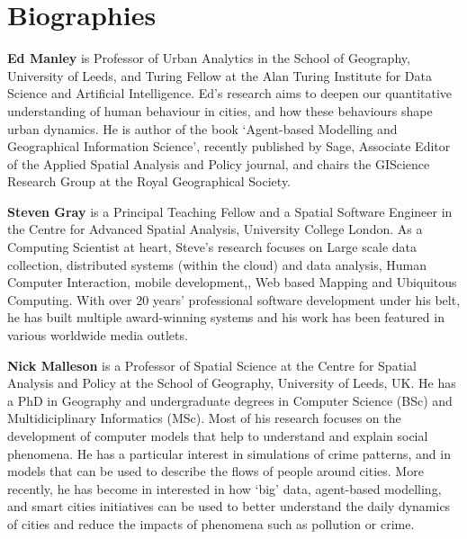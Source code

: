 \documentclass[11pt]{article}
\begin{document}
\section*{Biographies}

\textbf{Ed Manley} is Professor of Urban Analytics in the School of Geography, University of Leeds, and Turing Fellow at the Alan Turing Institute for Data Science and Artificial Intelligence. Ed's research aims to deepen our quantitative understanding of human behaviour in cities, and how these behaviours shape urban dynamics. He is author of the book `Agent-based Modelling and Geographical Information Science', recently published by Sage, Associate Editor of the Applied Spatial Analysis and Policy journal, and chairs the GIScience Research Group at the Royal Geographical Society.

\textbf{Steven Gray} is a Principal Teaching Fellow and a Spatial Software Engineer in the Centre for Advanced Spatial Analysis, University College London. As a Computing Scientist at heart,  Steve's research focuses on Large scale data collection, distributed systems (within the cloud) and data analysis, Human Computer Interaction, mobile development,, Web based Mapping and Ubiquitous Computing.  With over 20 years' professional software development under his belt, he has built multiple award-winning systems and his work has been featured in various worldwide media outlets.

\textbf{Nick Malleson}  is a Professor of Spatial Science at the Centre for Spatial Analysis and Policy at the School of Geography, University of Leeds, UK. He has a PhD in Geography and undergraduate degrees in Computer Science (BSc) and Multidiciplinary Informatics (MSc). Most of his research focuses on the development of computer models that help to understand and explain social phenomena. He has a particular interest in simulations of crime patterns, and in models that can be used to describe the flows of people around cities. More recently, he has become in interested in how `big' data, agent-based modelling, and smart cities initiatives can be used to better understand the daily dynamics of cities and reduce the impacts of phenomena such as pollution or crime.






\end{document}
